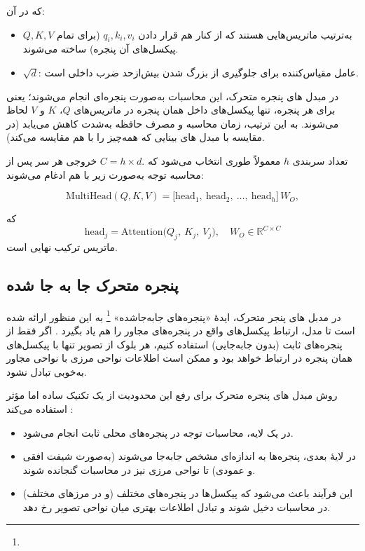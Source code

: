که در آن:

\begin{itemize}
	\item \(\displaystyle Q, K, V\) به‌ترتیب ماتریس‌هایی هستند که از کنار هم قرار دادن 
	\(\displaystyle q_i, k_i, v_i\) (برای تمام پیکسل‌های آن پنجره) ساخته می‌شوند.
	\item \(\displaystyle \sqrt{d}\): عامل مقیاس‌کننده برای جلوگیری از بزرگ شدن بیش‌ازحد ضرب داخلی است.
\end{itemize}

در مبدل های پنجره متحرک، این محاسبات به‌صورت پنجره‌ای انجام می‌شوند؛ یعنی 
برای هر پنجره، تنها پیکسل‌های داخل همان پنجره در ماتریس‌های 
\(\displaystyle Q\)، \(\displaystyle K\) و \(\displaystyle V\) لحاظ می‌شوند. 
به این ترتیب، زمان محاسبه و مصرف حافظه به‌شدت کاهش می‌یابد 
(در مقایسه با مبدل های بینایی که همه‌چیز را با هم مقایسه می‌کند).

تعداد سربندی \(\displaystyle h\) معمولاً طوری انتخاب می‌شود که 
\(\displaystyle C = h \times d.\) 
خروجی هر سر پس از محاسبه توجه به‌صورت زیر با هم ادغام می‌شوند:

\begin{equation}
	\mathrm{MultiHead}(Q,K,V) 
	= 
	\bigl[\text{head}_1,\ \text{head}_2,\ \dots,\ \text{head}_h\bigr]\,
	W_O,
\end{equation}

که 
\[
\text{head}_j = \mathrm{Attention}\bigl(Q_j,\ K_j,\ V_j\bigr),
\quad 
W_O \in \mathbb{R}^{C \times C}
\]
ماتریس ترکیب نهایی است.

\subsection{پنجره متحرک جا به جا شده}

در مدبل های پنجر متحرک، ایدهٔ «پنجره‌های جابه‌جاشده»    \footnote{}
به این منظور ارائه شده است تا مدل، ارتباط پیکسل‌های واقع در پنجره‌های مجاور را هم یاد بگیرد \cite{liu2021swintransformer}.
اگر فقط از پنجره‌های ثابت (بدون جابه‌جایی) استفاده کنیم، هر بلوک از تصویر تنها با پیکسل‌های همان 
پنجره در ارتباط خواهد بود و ممکن است اطلاعات نواحی مرزی با نواحی مجاور به‌خوبی تبادل نشود.

روش مبدل های پنجره متحرک برای رفع این محدودیت از یک تکنیک ساده اما مؤثر استفاده می‌کند \cite{liu2021swintransformer}:
\begin{itemize}
	\item در یک لایه، محاسبات توجه در پنجره‌های محلی ثابت انجام می‌شود.
	\item در لایهٔ بعدی، پنجره‌ها به اندازه‌ای مشخص جابه‌جا می‌شوند (به‌صورت شیفت افقی و عمودی) 
	تا نواحی مرزی نیز در محاسبات گنجانده شوند.
	\item این فرآیند باعث می‌شود که پیکسل‌ها در پنجره‌های مختلف (و در مرزهای مختلف) 
	در محاسبات دخیل شوند و تبادل اطلاعات بهتری میان نواحی تصویر رخ دهد.
\end{itemize}

